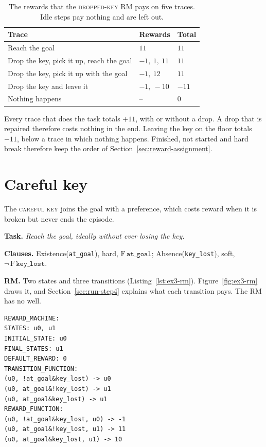 \documentclass[11pt,english,listoffigures,listoftables]{tfgetsinf}
\newcommand{\runex}[1]{\textsc{#1}}  %
\newcommand{\gain}[1]{\textcolor{green!40!black}{\bfseries\boldmath #1}}  %
\newcommand{\loss}[1]{\textcolor{red!60!black}{\bfseries\boldmath #1}}  %
\begin{document}
\begin{table}[H]
\centering
\footnotesize
\renewcommand{\arraystretch}{1.2}
\begin{tabular}{@{}lll@{}}
\toprule
\textbf{Trace} & \textbf{Rewards} & \textbf{Total} \\ \midrule
Reach the goal & $11$ & $11$ \\
Drop the key, pick it up, reach the goal & $-1,\ 1,\ 11$ & $11$ \\
Drop the key, pick it up with the goal & $-1,\ 12$ & $11$ \\
Drop the key and leave it & $-1,\ -10$ & $-11$ \\
Nothing happens & -- & $0$ \\ \bottomrule
\end{tabular}
\caption[Rewards of the \runex{dropped key} on five traces]{The rewards that the \runex{dropped-key} RM pays on five traces. Idle steps pay nothing and are left out.}
\label{tab:ex2-traces}
\end{table}

Every trace that does the task totals \gain{$+11$}, with or without a drop. A drop that is repaired therefore costs nothing in the end. Leaving the key on the floor totals \loss{$-11$}, below a trace in which nothing happens. Finished, not started and hard break therefore keep the order of Section~\ref{sec:reward-assignment}.

\section{Careful key}
\label{app:ex3}
The \runex{careful key} joins the goal with a preference, which costs reward when it is broken but never ends the episode.

\textbf{Task.} \textit{Reach the goal, ideally without ever losing the key.}

\textbf{Clauses.} Existence(\texttt{at\_goal}), hard, $\mathrm{F}\,\texttt{at\_goal}$; Absence(\texttt{key\_lost}), soft, $\neg\,\mathrm{F}\,\texttt{key\_lost}$.

\textbf{RM.} Two states and three transitions (Listing~\ref{lst:ex3-rm}). Figure~\ref{fig:ex3-rm} draws it, and Section~\ref{sec:run-step4} explains what each transition pays. The RM has no well.

\noindent\begin{minipage}{\linewidth}
\begin{lstlisting}[style=rm,caption={The RM of the \runex{careful-key} example.},label={lst:ex3-rm}]
REWARD_MACHINE:
STATES: u0, u1
INITIAL_STATE: u0
FINAL_STATES: u1
DEFAULT_REWARD: 0
TRANSITION_FUNCTION:
(u0, !at_goal&key_lost) -> u0
(u0, at_goal&!key_lost) -> u1
(u0, at_goal&key_lost) -> u1
REWARD_FUNCTION:
(u0, !at_goal&key_lost, u0) -> -1
(u0, at_goal&!key_lost, u1) -> 11
(u0, at_goal&key_lost, u1) -> 10
\end{lstlisting}
\end{minipage}

\end{document}
